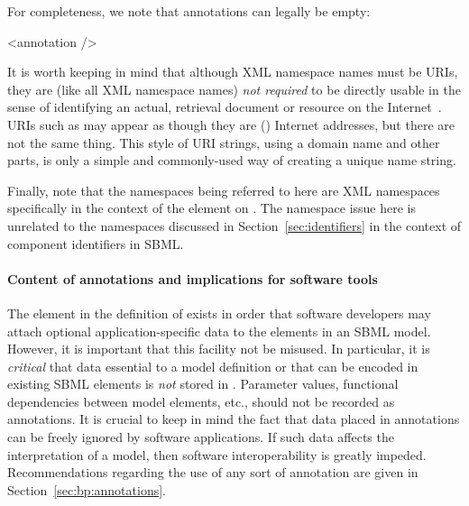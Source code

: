 For completeness, we note that annotations can legally be empty:

\begin{example}
<annotation />
\end{example}

It is worth keeping in mind that although XML namespace names must
be URIs, they are (like all XML namespace names) \emph{not
  required} to be directly usable in the sense of identifying an
actual, retrieval document or resource on the
Internet~\citep{bray:1999}.  URIs such as
 may appear as though they are (\eg)
Internet addresses, but there are not the same thing.  This style
of URI strings, using a domain name and other parts, is only a
simple and commonly-used way of creating a unique name string.

Finally, note that the namespaces being referred to here are XML
namespaces specifically in the context of the 
element on \SBase.  The namespace issue here is unrelated to the
namespaces discussed in Section~\ref{sec:identifiers} in the
context of component identifiers in SBML.


\paragraph{Content of annotations and implications for software tools}

The  element in the definition of \SBase exists in
order that software developers may attach optional
application-specific data to the elements in an SBML model.
However, it is important that this facility not be misused.  In
particular, it is \emph{critical} that data essential to a model
definition or that can be encoded in existing SBML elements is
\emph{not} stored in . Parameter values,
functional dependencies between model elements, etc., should not
be recorded as annotations.  It is crucial to keep in mind the
fact that data placed in annotations can be freely ignored by
software applications.  If such data affects the interpretation of
a model, then software interoperability is greatly impeded.  
Recommendations regarding the use of any sort of annotation are
given in Section~\ref{sec:bp:annotations}.  





%


